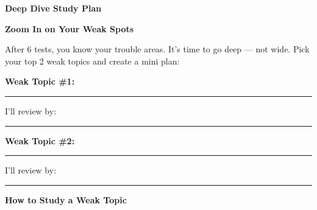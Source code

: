 \clearpage
\thispagestyle{empty}
{\sffamily

\begin{center}
{\fontsize{22}{26}\selectfont\bfseries\color{funPink} \faBullseye\hspace{3mm}Deep Dive Study Plan\hspace{3mm}\faBullseye}

\vspace{2mm}
{\color{funGray}\hrulefill}
\end{center}

\vspace{3mm}

\begin{tcolorbox}[
    enhanced,
    colback=funPinkLight,
    colframe=funPink!50,
    arc=10pt,
    boxrule=1.5pt,
    left=6mm, right=6mm, top=5mm, bottom=5mm,
]
{\large\bfseries\color{funPinkDark} \faMicroscope\hspace{2mm}Zoom In on Your Weak Spots}

\vspace{2mm}

After 6 tests, you know your trouble areas. It's time to go deep — not wide. Pick your top 2 weak topics and create a mini plan:

\vspace{3mm}

\textbf{Weak Topic \#1:} \rule[-2pt]{6cm}{0.5pt}

\vspace{1mm}

\hspace{5mm}\faArrowRight\hspace{2mm}I'll review by: \rule[-2pt]{5.5cm}{0.5pt}

\vspace{3mm}

\textbf{Weak Topic \#2:} \rule[-2pt]{6cm}{0.5pt}

\vspace{1mm}

\hspace{5mm}\faArrowRight\hspace{2mm}I'll review by: \rule[-2pt]{5.5cm}{0.5pt}
\end{tcolorbox}

\vspace{3mm}

\begin{tcolorbox}[
    enhanced,
    colback=funYellowLight,
    colframe=funYellow!60,
    arc=10pt,
    boxrule=1pt,
    left=6mm, right=6mm, top=4mm, bottom=4mm,
]
{\bfseries\color{funYellowDark} \faLightbulb\hspace{2mm}How to Study a Weak Topic}


\end{tcolorbox}}
